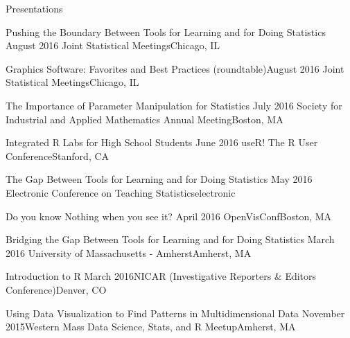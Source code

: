 \documentclass{resume} %
\begin{document}
\begin{rSection}{Presentations}

\begin{sSubsection}{Pushing the Boundary Between Tools for Learning and for Doing Statistics}{ }{August 2016 }{Joint Statistical Meetings}{Chicago, IL}
\end{sSubsection}

\begin{sSubsection}{Graphics Software: Favorites and Best Practices}{ (roundtable)}{August 2016 }{Joint Statistical Meetings}{Chicago, IL}
\end{sSubsection}


\begin{sSubsection}{The Importance of Parameter Manipulation for Statistics}{ }{July 2016 }{Society for Industrial and Applied Mathematics Annual Meeting}{Boston, MA}
\end{sSubsection}

\begin{sSubsection}{Integrated R Labs for High School Students}{ }{June 2016 }{useR! The R User Conference}{Stanford, CA}
\end{sSubsection}

\begin{sSubsection}{The Gap Between Tools for Learning and for Doing Statistics}{ }{May 2016 }{Electronic Conference on Teaching Statistics}{electronic}
\end{sSubsection}


\begin{sSubsection}{Do you know Nothing when you see it?}{ }{April 2016 }{OpenVisConf}{Boston, MA}
\end{sSubsection}

\begin{sSubsection}{Bridging the Gap Between Tools for Learning and for Doing Statistics}{ }{March 2016 }{University of Massachusetts - Amherst}{Amherst, MA}
\end{sSubsection}

\begin{sSubsection}{Introduction to R }{}{March 2016}{NICAR (Investigative Reporters \& Editors Conference)}{Denver, CO}
\end{sSubsection}

\begin{sSubsection}{Using Data Visualization to Find Patterns in Multidimensional Data}{ }{November 2015}{Western Mass Data Science, Stats, and R Meetup}{Amherst, MA}
\end{sSubsection}


\end{rSection}
\end{document}
